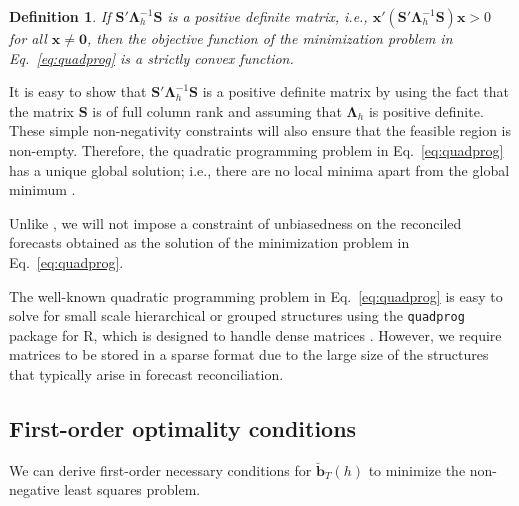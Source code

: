 \documentclass[11pt]{article}
\newcommand{\0}{\phantom{0}}
\newtheorem{definition}{Definition}[section]
\begin{document}
\begin{definition}
	If $\bm{S}'\bm{\Lambda}_{h}^{-1}\bm{S}$ is a positive definite matrix, i.e., $\bm{x}'(\bm{S}'\bm{\Lambda}_{h}^{-1}\bm{S})\bm{x} > 0$ for all $\bm{x} \neq \bm{0}$, then the objective function of the minimization problem in Eq.\ \eqref{eq:quadprog} is a strictly convex function.
\end{definition}

It is easy to show that $\bm{S}'\bm{\Lambda}_{h}^{-1}\bm{S}$ is a positive definite matrix by using the fact that the matrix $\bm{S}$ is of full column rank and assuming that $\bm{\Lambda}_{h}$ is positive definite. These simple non-negativity constraints will also ensure that the feasible region is non-empty. Therefore, the quadratic programming problem in Eq.\ \eqref{eq:quadprog} has a unique global solution; i.e., there are no local minima apart from the global minimum \citep{Turl2015}.

Unlike \citet{Wick2018}, we will not impose a constraint of unbiasedness on the reconciled forecasts obtained as the solution of the minimization problem in Eq.\ \eqref{eq:quadprog}.


The well-known quadratic programming problem in Eq.\ \eqref{eq:quadprog} is easy to solve for small scale hierarchical or grouped structures using the \texttt{quadprog} package for R, which is designed to handle dense matrices \citep{quadprog2013}. However, we require matrices to be stored in a sparse format due to the large size of the structures that typically arise in forecast reconciliation.

\subsection{First-order optimality conditions}

We can derive first-order necessary conditions for $\breve{\bm{b}}_{T}(h)$ to minimize the non-negative least squares problem. 
\end{document}
